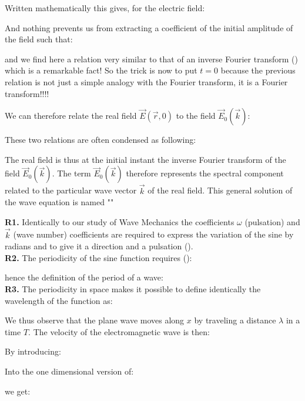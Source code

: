 	Written mathematically this gives, for the electric field:
	
	And nothing prevents us from extracting a coefficient of the initial amplitude of the field such that:
	
	and we find here a relation very similar to that of an inverse Fourier transform () which is a remarkable fact! So the trick is now to put $t=0$ because the previous relation is not just a simple analogy with the Fourier transform, it is a Fourier transform!!!!

	We can therefore relate the real field $\vec{E}(\vec{r},0)$ to the field $\vec{E}_0(\vec{k})$:
	
	These two relations are often condensed as following:
	
	The real field is thus at the initial instant the inverse Fourier transform of the field $\vec{E}_0(\vec{k})$. The term $\vec{E}_0(\vec{k})$ therefore represents the spectral component related to the particular wave vector $\vec{k}$ of the real field. This general solution of the wave equation is named ""
	\begin{tcolorbox}[title=Remarks,colframe=black,arc=10pt]
	\textbf{R1.} Identically to our study of Wave Mechanics the coefficients $\omega$ (pulsation) and $\vec{k}$ (wave number) coefficients are required to express the variation of the sine by radians and to give it a direction and a pulsation ().\\

	\textbf{R2.} The periodicity of the sine function requires ():
	
	hence the definition of the period of a wave:
	\\

	\textbf{R3.} The periodicity in space makes it possible to define identically the wavelength of the function as:
	
	We thus observe that the plane wave moves along $x$ by traveling a distance $\lambda$ in a time $T$. The velocity of the electromagnetic wave is then:
	
	\end{tcolorbox}
	By introducing:
	
	Into the one dimensional version of:
	
	we get:
	
